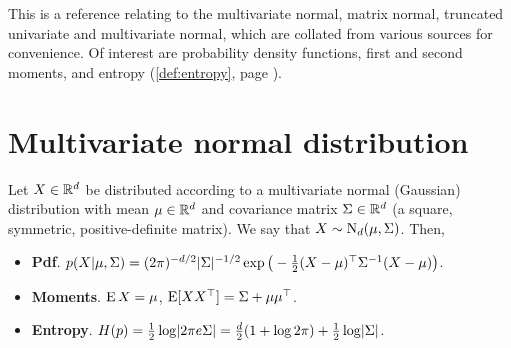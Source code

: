 This is a reference relating to the multivariate normal,  matrix normal, truncated univariate and multivariate normal, which are collated from various sources for convenience.
Of interest are probability density functions, first and second moments, and entropy (\cref{def:entropy}, page \pageref{def:entropy}).

\section{Multivariate normal distribution}
\label{apx:fishermultinormal}

Let $X\in\bbR^d$ be distributed according to a multivariate normal (Gaussian) distribution with mean $\mu \in \bbR^d$ and covariance matrix $\Sigma \in\bbR^d$ (a square, symmetric, positive-definite matrix).
We say that $X\sim\N_d(\mu,\Sigma)$.
Then,
\begin{itemize}
  \item \textbf{Pdf}. $p(X|\mu,\Sigma) = (2\pi)^{-d/2}|\Sigma|^{-1/2}\exp\big(-\half (X-\mu)^\top\Sigma^{-1}(X-\mu)\big)$.
  \item \textbf{Moments}. $\E X=\mu$, $\E [XX^\top] = \Sigma + \mu \mu^\top$.
  \item \textbf{Entropy}. $H(p) = \half \log \abs{2\pi e \Sigma} = \half[d](1 + \log 2\pi) + \half\log\abs{\Sigma}$.
\end{itemize}

